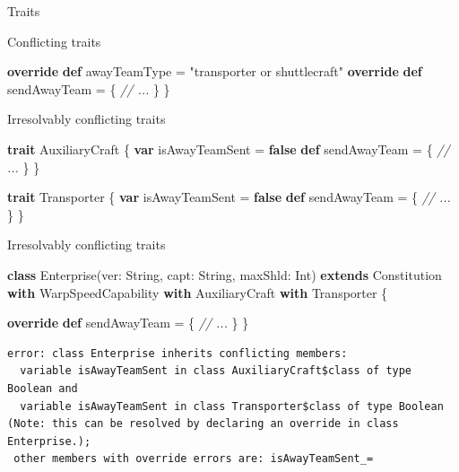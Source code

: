 \documentclass[ignorenonframetext,]{beamer}
\newenvironment{Shaded}{\begin{snugshade}}{\end{snugshade}}
\newcommand{\KeywordTok}[1]{\textcolor[rgb]{0.13,0.29,0.53}{\textbf{#1}}}
\newcommand{\StringTok}[1]{\textcolor[rgb]{0.31,0.60,0.02}{#1}}
\newcommand{\CommentTok}[1]{\textcolor[rgb]{0.56,0.35,0.01}{\textit{#1}}}
\newcommand{\FunctionTok}[1]{\textcolor[rgb]{0.00,0.00,0.00}{#1}}
\newcommand{\NormalTok}[1]{#1}
\begin{document}
\begin{frame}[fragile]{Traits}
\begin{block}{Conflicting traits}
\begin{Shaded}
\begin{Highlighting}[]
    \KeywordTok{override} \KeywordTok{def}\NormalTok{ awayTeamType = }\StringTok{"transporter or shuttlecraft"}
    \KeywordTok{override} \KeywordTok{def}\NormalTok{ sendAwayTeam = \{}
        \CommentTok{// ...}
\NormalTok{    \}}
\NormalTok{\}}
\end{Highlighting}
\end{Shaded}

\end{block}

\begin{block}{Irresolvably conflicting traits}

\begin{Shaded}
\begin{Highlighting}[]
\KeywordTok{trait}\NormalTok{ AuxiliaryCraft \{}
    \KeywordTok{var}\NormalTok{ isAwayTeamSent = }\KeywordTok{false}
    \KeywordTok{def}\NormalTok{ sendAwayTeam = \{}
        \CommentTok{// ...}
\NormalTok{    \}}
\NormalTok{\}}

\KeywordTok{trait}\NormalTok{ Transporter \{}
    \KeywordTok{var}\NormalTok{ isAwayTeamSent = }\KeywordTok{false}
    \KeywordTok{def}\NormalTok{ sendAwayTeam = \{}
        \CommentTok{// ...}
\NormalTok{    \}}
\NormalTok{\}}
\end{Highlighting}
\end{Shaded}

\end{block}

\begin{block}{Irresolvably conflicting traits}

\begin{Shaded}
\begin{Highlighting}[]
\KeywordTok{class} \FunctionTok{Enterprise}\NormalTok{(ver: String, capt: String, maxShld: Int) }
\KeywordTok{extends}\NormalTok{ Constitution }\KeywordTok{with}\NormalTok{ WarpSpeedCapability }
                     \KeywordTok{with}\NormalTok{ AuxiliaryCraft }
                     \KeywordTok{with}\NormalTok{ Transporter \{}
                     
    \KeywordTok{override} \KeywordTok{def}\NormalTok{ sendAwayTeam = \{}
        \CommentTok{// ...}
\NormalTok{    \}}
\NormalTok{\}}
\end{Highlighting}
\end{Shaded}

\begin{verbatim}
error: class Enterprise inherits conflicting members:
  variable isAwayTeamSent in class AuxiliaryCraft$class of type Boolean and
  variable isAwayTeamSent in class Transporter$class of type Boolean
(Note: this can be resolved by declaring an override in class Enterprise.);
 other members with override errors are: isAwayTeamSent_=
\end{verbatim}

\end{block}

\end{frame}
\end{document}
